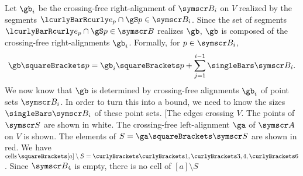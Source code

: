 \documentclass[10pt, a4paper, twoside]{basestyle}
\DeclareMathOperator{\cells}{cells}
\newcommand{\pointset}{\symscr}
\begin{document}
Let $\gb_i$ be the crossing-free right-alignment of $\pointset B_i$ on $V$ realized by
the segments $\setst{e_p\Intersection \gS}{p\in\pointset B_i}$.
Since the set of segments $\setst{e_p\Intersection \gS}{p\in\pointset B}$ realizes $\gb$,
$\gb$ is composed of the crossing-free right-alignments $\gb_i$. Formally, for
$p\in\pointset B_i$,
\[\gb\of p = \gb_i\of p + \sum{j=1}[i-1] \Cardinality{\pointset B_i}\text.\]
We now know that $\gb$ is determined by crossing-free alignments $\gb_i$ of point sets $\pointset B_i$.
In order to turn this into a bound, we need to know the sizes $\Cardinality{\pointset B_i}$ of these
point sets.
\marginfig[The edges crossing $V$. The points of $\pointset S$ are shown in white. The
crossing-free left-alignment $\ga$ of $\pointset A$ on $V$ is shown.
The elements of $S=\ga\of{\pointset S}$ are shown in red.
We have $\cells\of{[a]\setminus S}=\set{\set{1},\set{3,4},\set{6}}$.
Since $\pointset B_4$ is empty, there is no cell of ${[a]\setminus S}$
\end{document}
